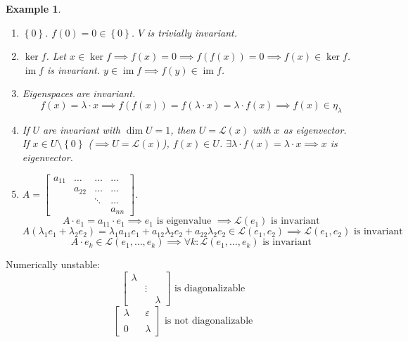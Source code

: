 \documentclass{article}
\newcounter{lecref}[section]
\numberwithin{lecref}{section}
\newtheorem{example}[lecref]{Example}
\newcommand{\set}[1]{\left\{#1\right\}}
\DeclareMathOperator{\im}{im}
\begin{document}
\begin{example} %
  \begin{enumerate}
    \item $\set{0}$. $f(0) = 0 \in \set{0}$. $V$ is trivially invariant.
    \item $\ker{f}$. Let $x \in \ker{f} \implies f(x) = 0 \implies f(f(x)) = 0 \implies f(x) \in \ker{f}$. \\
      $\im{f}$ is invariant. $y \in \im{f} \implies f(y) \in \im{f}$.
    \item Eigenspaces are invariant.
      \[ f(x) = \lambda \cdot x \implies f(f(x)) = f(\lambda \cdot x) = \lambda \cdot f(x) \implies f(x) \in \eta_{\lambda} \]
    \item If $U$ are invariant with $\dim{U} = 1$, then $U = \mathcal L(x)$ with $x$ as eigenvector. \\
      If $x \in U \setminus \set{0}$ ($\implies U = \mathcal L(x)$), $f(x) \in U$. $\exists \lambda \cdot f(x) = \lambda \cdot x \implies x$ is eigenvector.
    \item $A = \begin{bmatrix} a_{11} & \dots & \dots & \dots \\ & a_{22} & \dots & \dots \\ & & \ddots & \dots \\ & & & a_{nn} \end{bmatrix}$.
      \[ A \cdot e_1 = a_{11} \cdot e_1 \implies e_1 \text{ is eigenvalue } \implies \mathcal L(e_1) \text{ is invariant} \]
      \[ A(\lambda_1 e_1 + \lambda_2 e_2) = \lambda_1 a_{11} e_1 + a_{12} \lambda_2 e_2 + a_{22} \lambda_2 e_2 \in \mathcal L(e_1, e_2) \implies \mathcal L(e_1, e_2) \text{ is invariant} \]
      \[ A \cdot e_k \in \mathcal L(e_1, \dots, e_k) \implies \forall k: \mathcal L(e_1, \dots, e_k) \text{ is invariant} \]
  \end{enumerate}
\end{example}

Numerically unstable:
\[
  \begin{bmatrix} \lambda & & \\ & \vdots & \\ & & \lambda \end{bmatrix}
  \text{ is diagonalizable}
\] \[
  \begin{bmatrix} \lambda & & \varepsilon \\ & & \\ 0 & & \lambda \end{bmatrix}
  \text{ is not diagonalizable}
\]
\end{document}
